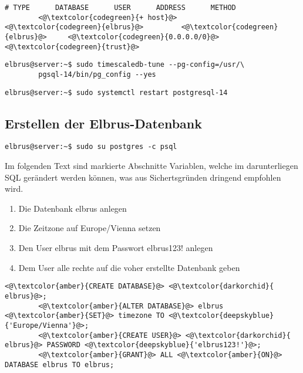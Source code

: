 \documentclass{article}
\begin{document}
	\begin{lstlisting}[caption={var/lib/pgsql/14/data/postgresql.conf - Ändern der folgenden Zeilen}, numbers=none]
		# TYPE      DATABASE      USER      ADDRESS      METHOD
		<@\textcolor{codegreen}{+ host}@>       <@\textcolor{codegreen}{elbrus}@>         <@\textcolor{codegreen}{elbrus}@>     <@\textcolor{codegreen}{0.0.0.0/0}@>      <@\textcolor{codegreen}{trust}@>
	\end{lstlisting}
	
	\lstset{style=commands}
	\begin{lstlisting}[caption={Anpassen der Datenbank Einstellungen auf die Server Hardware.}]
		elbrus@server:~$ sudo timescaledb-tune --pg-config=/usr/\
		pgsql-14/bin/pg_config --yes
	\end{lstlisting}

	\begin{lstlisting}[caption={Neustarten des Services um Änderungen zu übernehmen.}]
		elbrus@server:~$ sudo systemctl restart postgresql-14
	\end{lstlisting}

	\newpage
	\subsection{Erstellen der Elbrus-Datenbank}
	\begin{lstlisting}[caption={Verbinden mit dem interaktiven Terminal von 'postgres'.}]
		elbrus@server:~$ sudo su postgres -c psql
	\end{lstlisting}
	Im folgenden Text sind markierte Abschnitte Variablen, welche im darunterliegen SQL gerändert werden können, was aus Sichertsgründen dringend empfohlen wird.
	\begin{enumerate}
		\item Die Datenbank elbrus anlegen
		\item Die Zeitzone auf Europe/Vienna setzen
		\item Den User elbrus mit dem Passwort elbrus123! anlegen
		\item Dem User alle rechte auf die voher erstellte Datenbank geben
	\end{enumerate}	

	\lstset{style=files}
	\begin{lstlisting}[caption={Auführen von SQL Befehlen.}, numbers=none]
		<@\textcolor{amber}{CREATE DATABASE}@> <@\textcolor{darkorchid}{ elbrus}@>;
		<@\textcolor{amber}{ALTER DATABASE}@> elbrus <@\textcolor{amber}{SET}@> timezone TO <@\textcolor{deepskyblue}{'Europe/Vienna'}@>;
		<@\textcolor{amber}{CREATE USER}@> <@\textcolor{darkorchid}{ elbrus}@> PASSWORD <@\textcolor{deepskyblue}{'elbrus123!'}@>;
		<@\textcolor{amber}{GRANT}@> ALL <@\textcolor{amber}{ON}@> DATABASE elbrus TO elbrus;
	\end{lstlisting}
	
\end{document}
